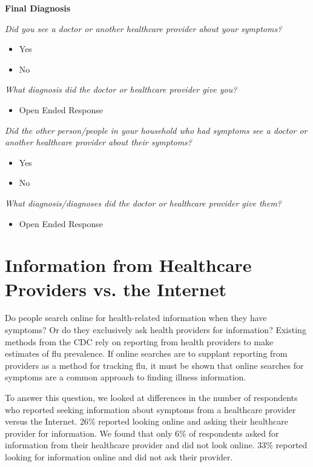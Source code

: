 \documentclass[12pt]{article}
\begin{document}
\textbf{Final Diagnosis}

\emph{Did you see a doctor or another healthcare provider about your symptoms?}
\begin{itemize}
\item Yes
\item No
\end{itemize}

\emph{What diagnosis did the doctor or healthcare provider give you?}
\begin{itemize}
\item Open Ended Response
\end{itemize}

\emph{Did the other person/people in your household who had symptoms see a doctor or another healthcare provider about their symptoms?}
\begin{itemize}
\item Yes
\item No
\end{itemize}

\emph{What diagnosis/diagnoses did the doctor or healthcare provider give them?}
\begin{itemize}
\item Open Ended Response
\end{itemize}




\section{Information from Healthcare Providers vs. the Internet}

Do people search online for health-related information when they have symptoms? Or do they exclusively ask health providers for information? Existing methods from the CDC rely on reporting from health providers to make estimates of flu prevalence. If online searches are to supplant reporting from providers as a method for tracking flu, it must be shown that online searches for symptoms are a common approach to finding illness information.

To answer this question, we looked at differences in the number of respondents who reported seeking information about symptoms from a healthcare provider versus the Internet. 26\% reported looking online and asking their healthcare provider for information. We found that only 6\% of respondents asked for information from their healthcare provider and did not look online. 33\% reported looking for information online and did not ask their provider.
\end{document}
